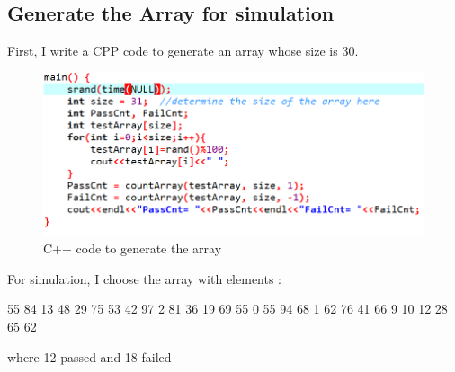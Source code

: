 \documentclass[12pt]{article}
\begin{document}
\subsection{Generate the Array for simulation}
First, I write a CPP code to generate an array whose size is 30.
\begin{figure}[H]
\centering
\includegraphics[scale=0.5]{cpp2.png}
\caption{C++ code to generate the array}
\end{figure}
For simulation, I choose the array with elements :
\par 55 84 13 48 29 75 53 42 97 2 81 36 19 69 55 0 55 94 68 1 62 76 41 66 9 10 12 28 65 62
\par where 12 passed and 18 failed
\end{document}
